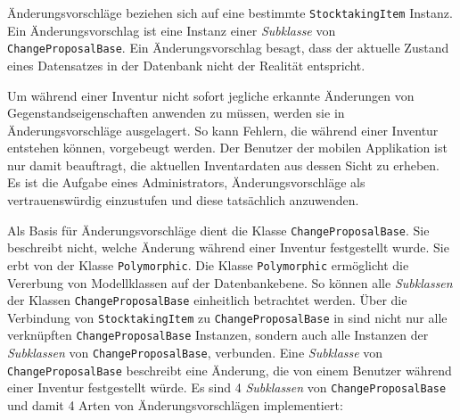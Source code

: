 Änderungsvorschläge beziehen sich auf eine bestimmte
\texttt{StocktakingItem} Instanz. Ein Änderungsvorschlag ist eine
Instanz einer
\emph{Subklasse}
von \texttt{ChangeProposalBase}. Ein Änderungsvorschlag besagt, dass der
aktuelle Zustand eines Datensatzes in der Datenbank nicht der Realität
entspricht.

Um während einer Inventur nicht sofort jegliche erkannte Änderungen von
Gegenstandseigenschaften anwenden zu müssen, werden sie in
Änderungsvorschläge ausgelagert. So kann Fehlern, die während einer
Inventur entstehen können, vorgebeugt werden. Der Benutzer der mobilen
Applikation ist nur damit beauftragt, die aktuellen Inventardaten aus
dessen Sicht zu erheben. Es ist die Aufgabe eines Administrators,
Änderungsvorschläge als vertrauenswürdig einzustufen und diese
tatsächlich anzuwenden.

Als Basis für Änderungsvorschläge dient die Klasse
\texttt{ChangeProposalBase}. Sie beschreibt nicht, welche Änderung
während einer Inventur festgestellt wurde. Sie erbt von der Klasse
\texttt{Polymorphic}. Die Klasse \texttt{Polymorphic} ermöglicht die
Vererbung von Modellklassen auf der Datenbankebene. So können alle
\emph{Subklassen}
der Klassen \texttt{ChangeProposalBase} einheitlich betrachtet werden.
Über die Verbindung von \texttt{StocktakingItem} zu
\texttt{ChangeProposalBase} in 
sind nicht nur alle verknüpften \texttt{ChangeProposalBase} Instanzen,
sondern auch alle Instanzen der
\emph{Subklassen}
von \texttt{ChangeProposalBase}, verbunden. Eine
\emph{Subklasse}
von \texttt{ChangeProposalBase} beschreibt eine Änderung, die von einem
Benutzer während einer Inventur festgestellt würde. Es sind 4
\emph{Subklassen}
von \texttt{ChangeProposalBase} und damit 4 Arten von
Änderungsvorschlägen implementiert:

